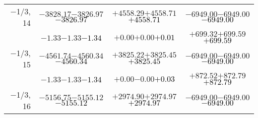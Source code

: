 \documentclass[compress]{beamer}
\begin{document}
\begin{frame}
{\begin{tabular}{r | c | c | c}
$-$1/3, 14 & $-3828.17$\hspace{0.1 cm}$-3826.97$\hspace{0.1 cm}\textcolor{black}{$-3826.97$} & $+4558.29$\hspace{0.1 cm}$+4558.71$\hspace{0.1 cm}\textcolor{black}{$+4558.71$} & $-6949.00$\hspace{0.1 cm}$-6949.00$\hspace{0.1 cm}\textcolor{black}{$-6949.00$} \\
           & $-1.33$\hspace{0.1 cm}$-1.33$\hspace{0.1 cm}\textcolor{black}{$-1.34$} & $+0.00$\hspace{0.1 cm}$+0.00$\hspace{0.1 cm}\textcolor{black}{$+0.01$} & $+699.32$\hspace{0.1 cm}$+699.59$\hspace{0.1 cm}\textcolor{black}{$+699.59$} \\
$-$1/3, 15 & $-4561.74$\hspace{0.1 cm}$-4560.34$\hspace{0.1 cm}\textcolor{black}{$-4560.34$} & $+3825.22$\hspace{0.1 cm}$+3825.45$\hspace{0.1 cm}\textcolor{black}{$+3825.45$} & $-6949.00$\hspace{0.1 cm}$-6949.00$\hspace{0.1 cm}\textcolor{black}{$-6949.00$} \\
           & $-1.33$\hspace{0.1 cm}$-1.33$\hspace{0.1 cm}\textcolor{black}{$-1.34$} & $+0.00$\hspace{0.1 cm}$-0.00$\hspace{0.1 cm}\textcolor{black}{$+0.03$} & $+872.52$\hspace{0.1 cm}$+872.79$\hspace{0.1 cm}\textcolor{black}{$+872.79$} \\
$-$1/3, 16 & $-5156.75$\hspace{0.1 cm}$-5155.12$\hspace{0.1 cm}\textcolor{black}{$-5155.12$} & $+2974.90$\hspace{0.1 cm}$+2974.97$\hspace{0.1 cm}\textcolor{black}{$+2974.97$} & $-6949.00$\hspace{0.1 cm}$-6949.00$\hspace{0.1 cm}\textcolor{black}{$-6949.00$} \\

\end{tabular}}
\end{frame}
\end{document}

